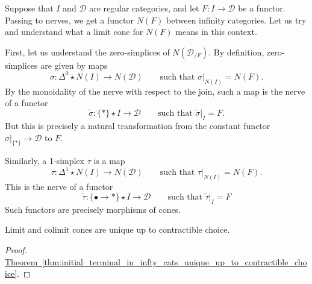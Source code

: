 \documentclass[main.tex]{subfiles}
\begin{document}
Suppose that $I$ and $\mathcal{D}$ are regular categories, and let $F\colon I \to \mathcal{D}$ be a functor. Passing to nerves, we get a functor $N(F)$ between infinity categories. Let us try and understand what a limit cone for $N(F)$ means in this context.

First, let us understand the zero-simplices of $N(\mathcal{D}_{/F})$. By definition, zero-simplices are given by maps
\begin{equation*}
  \sigma\colon \Delta^{0} \star N(I) \to N(\mathcal{D}) \qquad\text{such that } \sigma|_{N(I)} = N(F).
\end{equation*}
By the monoidality of the nerve with respect to the join, such a map is the nerve of a functor
\begin{equation*}
  \tilde{\sigma}\colon \{*\} \star I \to \mathcal{D} \qquad\text{such that } \tilde{\sigma}|_{I} = F.
\end{equation*}
But this is precisely a natural transformation from the constant functor $\sigma|_{\{*\}} \to \mathcal{D}$ to $F$.

Similarly, a 1-simplex $\tau$ is a map
\begin{equation*}
  \tau\colon \Delta^{1} \star N(I) \to N(\mathcal{D})\qquad\text{such that }\tau|_{N(I)} = N(F).
\end{equation*}
This is the nerve of a functor
\begin{equation*}
  \tilde{\tau}\colon \{\bullet \to *\} \star I \to \mathcal{D}\qquad \text{such that } \tilde{\tau}|_{I} = F
\end{equation*}
Such functors are precisely morphisms of cones.

\begin{corollary}
  Limit and colimit cones are unique up to contractible choice.
\end{corollary}
\begin{proof}
  \hyperref[thm:initial_terminal_in_infty_cats_unique_up_to_contractible_choice]{Theorem~\ref*{thm:initial_terminal_in_infty_cats_unique_up_to_contractible_choice}}.
\end{proof}
\end{document}
